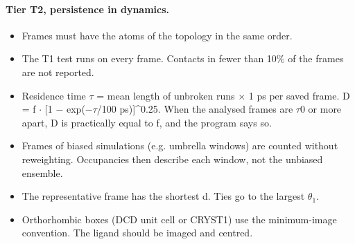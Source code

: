 \paragraph{Tier T2, persistence in dynamics.}
\begin{itemize}[nosep,leftmargin=*]
\item Frames must have the atoms of the topology in the same order.
\item The T1 test runs on every frame. Contacts in fewer than 10\% of the frames are not reported.
\item Residence time $\tau$ = mean length of unbroken runs $\times$ 1 ps per saved frame. D = f $\cdot$ [1 $-$ exp($-\tau$/100 ps)]\^{}0.25. When the analysed frames are $\tau$0 or more apart, D is practically equal to f, and the program says so.
\item Frames of biased simulations (e.g. umbrella windows) are counted without reweighting. Occupancies then describe each window, not the unbiased ensemble.
\item The representative frame has the shortest d. Ties go to the largest $\theta_1$.
\item Orthorhombic boxes (DCD unit cell or CRYST1) use the minimum-image convention. The ligand should be imaged and centred.
\end{itemize}
